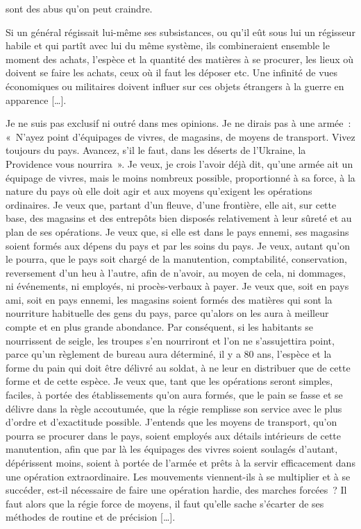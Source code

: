 \documentclass[french,twoside]{book} %
\begin{document}
sont des abus qu’on peut craindre.\par
Si un général régissait lui-même ses subsistances, ou qu’il eût sous lui un régisseur habile et qui partît avec lui du même système, ils combineraient ensemble le moment des achats, l’espèce et la quantité des matières à se procurer, les lieux où doivent se faire les achats, ceux où il faut les déposer etc. Une infinité de vues économiques ou militaires doivent influer sur ces objets étrangers à la guerre en apparence […].\par
Je ne suis pas exclusif ni outré dans mes opinions. Je ne dirais pas à une armée : « N’ayez point d’équipages de vivres, de magasins, de moyens de transport. Vivez toujours du pays. Avancez, s’il le faut, dans les déserts de l’Ukraine, la Providence vous nourrira ». Je veux, je crois l’avoir déjà dit, qu’une armée ait un équipage de vivres, mais le moins nombreux possible, proportionné à sa force, à la nature du pays où elle doit agir et aux moyens qu’exigent les opérations ordinaires. Je veux que, partant d’un fleuve, d’une frontière, elle ait, sur cette base, des magasins et des entrepôts bien disposés relativement à leur sûreté et au plan de ses opérations. Je veux que, si elle est dans le pays ennemi, ses magasins soient formés aux dépens du pays et par les soins du pays. Je veux, autant qu’on le pourra, que le pays soit chargé de la manutention, comptabilité, conservation, reversement d’un heu à l’autre, afin de n’avoir, au moyen de cela, ni dommages, ni événements, ni employés, ni procès-verbaux à payer. Je veux que, soit en pays ami, soit en pays ennemi, les magasins soient formés des matières qui sont la nourriture habituelle des gens du pays, parce qu’alors on les aura à meilleur compte et en plus grande abondance. Par conséquent, si les habitants se nourrissent de seigle, les troupes s’en nourriront et l’on ne s’assujettira point, parce qu’un règlement de bureau aura déterminé, il y a 80 ans, l’espèce et la forme du pain qui doit être délivré au soldat, à ne leur en distribuer que de cette forme et de cette espèce. Je veux que, tant que les opérations seront simples, faciles, à portée des établissements qu’on aura formés, que le pain se fasse et se délivre dans la règle accoutumée, que la régie remplisse son service avec le plus d’ordre et d’exactitude possible. J’entends que les moyens de transport, qu’on pourra se procurer dans le pays, soient employés aux détails intérieurs de cette manutention, afin que par là les équipages des vivres soient soulagés d’autant, dépérissent moins, soient à portée de l’armée et prêts à la servir efficacement dans une opération extraordinaire. Les mouvements viennent-ils à se multiplier et à se succéder, est-il nécessaire de faire une opération hardie, des marches forcées ? Il faut alors que la régie force de moyens, il faut qu’elle sache s’écarter de ses méthodes de routine et de précision […].\par
\end{document}
